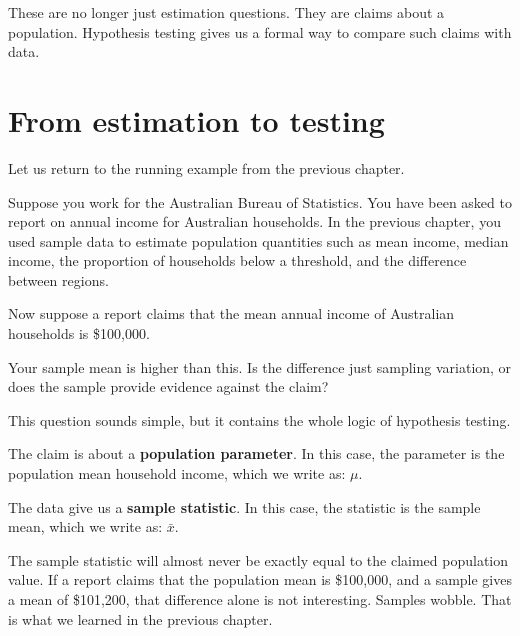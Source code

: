 \documentclass[
  letterpaper,
  DIV=11,
  numbers=noendperiod]{scrreprt}
\begin{document}
These are no longer just estimation questions. They are claims about a
population. Hypothesis testing gives us a formal way to compare such
claims with data.

\section{From estimation to testing}\label{from-estimation-to-testing}

Let us return to the running example from the previous chapter.

\begin{tcolorbox}[enhanced jigsaw, arc=.35mm, bottomrule=.15mm, bottomtitle=1mm, breakable, colback=white, colbacktitle=quarto-callout-note-color!10!white, colframe=quarto-callout-note-color-frame, coltitle=black, left=2mm, leftrule=.75mm, opacityback=0, opacitybacktitle=0.6, rightrule=.15mm, title=\textcolor{quarto-callout-note-color}{\faInfo}\hspace{0.5em}{Household income}, titlerule=0mm, toprule=.15mm, toptitle=1mm]

Suppose you work for the Australian Bureau of Statistics. You have been
asked to report on annual income for Australian households. In the
previous chapter, you used sample data to estimate population quantities
such as mean income, median income, the proportion of households below a
threshold, and the difference between regions.

Now suppose a report claims that the mean annual income of Australian
households is \$100,000.

Your sample mean is higher than this. Is the difference just sampling
variation, or does the sample provide evidence against the claim?

\end{tcolorbox}

This question sounds simple, but it contains the whole logic of
hypothesis testing.

The claim is about a \textbf{population parameter}. In this case, the
parameter is the population mean household income, which we write as:
\(\mu\).

The data give us a \textbf{sample statistic}. In this case, the
statistic is the sample mean, which we write as: \(\bar{x}\).

The sample statistic will almost never be exactly equal to the claimed
population value. If a report claims that the population mean is
\$100,000, and a sample gives a mean of \$101,200, that difference alone
is not interesting. Samples wobble. That is what we learned in the
previous chapter.
\end{document}
